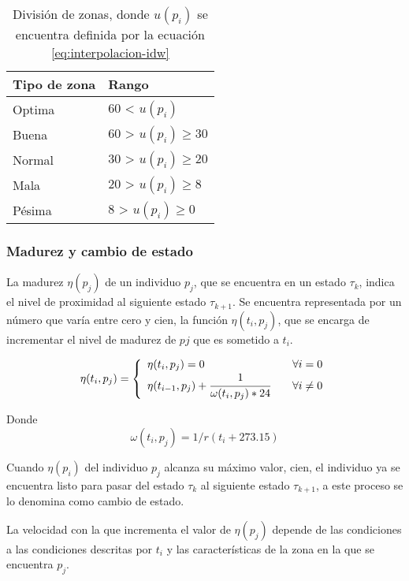 \begin{table}
\centering
    \label{tab:puntaje-zona}
    \begin{tabular}{p{3cm} p{3cm}}
        Tipo de zona & Rango\\
        \hline
         Optima & 60 < $u(p_{i})$ \\
        Buena & 60 > $u(p_{i}) \geq 30$ \\
        Normal & 30 > $u(p_{i}) \geq 20$\\
        Mala & 20 > $u(p_{i}) \geq 8$\\
        Pésima & 8 > $u(p_{i}) \geq 0$ \\
    \end{tabular}
    \caption{División de zonas, donde $u(p_{i})$ se encuentra definida por la ecuación \eqref{eq:interpolacion-idw}}
\end{table}

\subsubsection{Madurez y cambio de estado}
La madurez $\eta (p_{j})$ de un individuo $p_{j}$, que se encuentra en un estado $\tau_{k}$, indica el nivel de
proximidad al siguiente estado $\tau_{k+1}$. Se encuentra representada por un número que varía entre
cero y cien, la función $\eta (t_{i}, p_{j})$, que se encarga de incrementar el nivel de madurez de $p{j}$
que es sometido a $t_{i}$.

\begin{equation}
\eta (t_{i}, p_{j}) = \left\{
  \begin{array}{l l}
    \eta (t_{i}, p_{j}) = 0 & \quad \forall i = 0 \\
    \eta (t_{i-1},p_{j}) + \cfrac{1}{\omega(t_{i}, p_{j}) * 24} & \quad \forall i \neq 0
  \end{array} \right.
\end{equation}

Donde 
\begin{equation}
    \omega(t_{i}, p_{j}) = 1/r(t_{i} + 273.15)
\end{equation}

Cuando $\eta(p_{i})$ del individuo $p_{j}$ alcanza su máximo valor, cien, el individuo ya se encuentra listo para
pasar del estado $\tau_{k}$ al siguiente estado $\tau_{k+1}$, a este proceso se lo denomina como cambio de estado.

La velocidad con la que incrementa el valor de $\eta(p_{j})$ depende de las condiciones a las condiciones
descritas  por $t_{i}$ y las características de la zona en la que se encuentra $p_{j}$.

